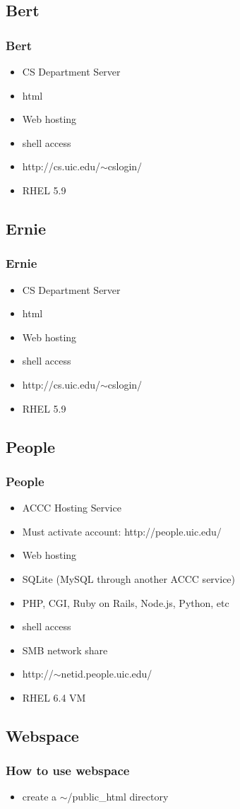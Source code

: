 \documentclass[hyperref={pdfpagelabels=false}]{beamer}
\begin{document}
\subsection{Bert}
\frame
{
    \frametitle{Bert}
    \begin{itemize}
    \item{CS Department Server}
    \item{html}
    \item{Web hosting}
    \item{shell access}
    \item{http://cs.uic.edu/$\sim$cslogin/}
    \item{RHEL 5.9}
    \end{itemize}
}
\subsection{Ernie}
\frame
{
    \frametitle{Ernie}
    \begin{itemize}
    \item{CS Department Server}
    \item{html}
    \item{Web hosting}
    \item{shell access}
    \item{http://cs.uic.edu/$\sim$cslogin/}
    \item{RHEL 5.9}
    \end{itemize}
}
\subsection{People}
\frame
{
    \frametitle{People}
    \begin{itemize}
    \item{ACCC Hosting Service}
    \item{Must activate account: http://people.uic.edu/}
    \item{Web hosting}
    \item{SQLite (MySQL through another ACCC service)}
    \item{PHP, CGI, Ruby on Rails, Node.js, Python, etc}
    \item{shell access}
    \item{SMB network share}
    \item{http://$\sim$netid.people.uic.edu/}
    \item{RHEL 6.4 VM}
    \end{itemize}
}
\subsection{Webspace}
\frame
{
    \frametitle{How to use webspace}
    \begin{itemize}
    \item{create a $\sim$/public\_html directory}
    \end{itemize}
}
\end{document}
